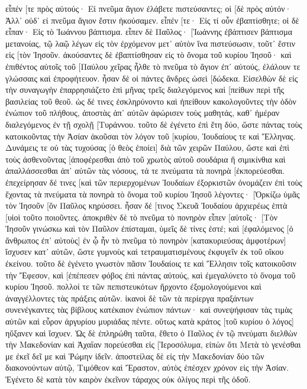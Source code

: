 εἶπέν [τε πρὸς αὐτούς· Εἰ πνεῦμα ἅγιον ἐλάβετε πιστεύσαντες; οἱ [δὲ πρὸς αὐτόν· Ἀλλ᾽ οὐδ᾽ εἰ πνεῦμα ἅγιον ἔστιν ἠκούσαμεν. 
εἶπέν [τε· Εἰς τί οὖν ἐβαπτίσθητε; οἱ δὲ εἶπαν· Εἰς τὸ Ἰωάννου βάπτισμα. 
εἶπεν δὲ Παῦλος· [Ἰωάννης ἐβάπτισεν βάπτισμα μετανοίας, τῷ λαῷ λέγων εἰς τὸν ἐρχόμενον μετ᾽ αὐτὸν ἵνα πιστεύσωσιν, τοῦτ᾽ ἔστιν εἰς [τὸν Ἰησοῦν. 
ἀκούσαντες δὲ ἐβαπτίσθησαν εἰς τὸ ὄνομα τοῦ κυρίου Ἰησοῦ· 
καὶ ἐπιθέντος αὐτοῖς τοῦ [Παύλου χεῖρας ἦλθε τὸ πνεῦμα τὸ ἅγιον ἐπ᾽ αὐτούς, ἐλάλουν τε γλώσσαις καὶ ἐπροφήτευον. 
ἦσαν δὲ οἱ πάντες ἄνδρες ὡσεὶ [δώδεκα. 
Εἰσελθὼν δὲ εἰς τὴν συναγωγὴν ἐπαρρησιάζετο ἐπὶ μῆνας τρεῖς διαλεγόμενος καὶ [πείθων περὶ τῆς βασιλείας τοῦ θεοῦ. 
ὡς δέ τινες ἐσκληρύνοντο καὶ ἠπείθουν κακολογοῦντες τὴν ὁδὸν ἐνώπιον τοῦ πλήθους, ἀποστὰς ἀπ᾽ αὐτῶν ἀφώρισεν τοὺς μαθητάς, καθ᾽ ἡμέραν διαλεγόμενος ἐν τῇ σχολῇ [Τυράννου. 
τοῦτο δὲ ἐγένετο ἐπὶ ἔτη δύο, ὥστε πάντας τοὺς κατοικοῦντας τὴν Ἀσίαν ἀκοῦσαι τὸν λόγον τοῦ [κυρίου, Ἰουδαίους τε καὶ Ἕλληνας. 
Δυνάμεις τε οὐ τὰς τυχούσας [ὁ θεὸς ἐποίει] διὰ τῶν χειρῶν Παύλου, 
ὥστε καὶ ἐπὶ τοὺς ἀσθενοῦντας [ἀποφέρεσθαι ἀπὸ τοῦ χρωτὸς αὐτοῦ σουδάρια ἢ σιμικίνθια καὶ ἀπαλλάσσεσθαι ἀπ᾽ αὐτῶν τὰς νόσους, τά τε πνεύματα τὰ πονηρὰ [ἐκπορεύεσθαι. 
ἐπεχείρησαν δέ τινες [καὶ τῶν περιερχομένων Ἰουδαίων ἐξορκιστῶν ὀνομάζειν ἐπὶ τοὺς ἔχοντας τὰ πνεύματα τὰ πονηρὰ τὸ ὄνομα τοῦ κυρίου Ἰησοῦ λέγοντες· [Ὁρκίζω ὑμᾶς τὸν Ἰησοῦν [ὃν Παῦλος κηρύσσει. 
ἦσαν δέ [τινος Σκευᾶ Ἰουδαίου ἀρχιερέως ἑπτὰ [υἱοὶ τοῦτο ποιοῦντες. 
ἀποκριθὲν δὲ τὸ πνεῦμα τὸ πονηρὸν εἶπεν [αὐτοῖς· [Τὸν Ἰησοῦν γινώσκω καὶ τὸν Παῦλον ἐπίσταμαι, ὑμεῖς δὲ τίνες ἐστέ; 
καὶ [ἐφαλόμενος [ὁ ἄνθρωπος ἐπ᾽ αὐτοὺς] ἐν ᾧ ἦν τὸ πνεῦμα τὸ πονηρὸν [κατακυριεύσας ἀμφοτέρων] ἴσχυσεν κατ᾽ αὐτῶν, ὥστε γυμνοὺς καὶ τετραυματισμένους ἐκφυγεῖν ἐκ τοῦ οἴκου ἐκείνου. 
τοῦτο δὲ ἐγένετο γνωστὸν πᾶσιν Ἰουδαίοις τε καὶ Ἕλλησιν τοῖς κατοικοῦσιν τὴν Ἔφεσον, καὶ [ἐπέπεσεν φόβος ἐπὶ πάντας αὐτούς, καὶ ἐμεγαλύνετο τὸ ὄνομα τοῦ κυρίου Ἰησοῦ. 
πολλοί τε τῶν πεπιστευκότων ἤρχοντο ἐξομολογούμενοι καὶ ἀναγγέλλοντες τὰς πράξεις αὐτῶν. 
ἱκανοὶ δὲ τῶν τὰ περίεργα πραξάντων συνενέγκαντες τὰς βίβλους κατέκαιον ἐνώπιον πάντων· καὶ συνεψήφισαν τὰς τιμὰς αὐτῶν καὶ εὗρον ἀργυρίου μυριάδας πέντε. 
οὕτως κατὰ κράτος [τοῦ κυρίου ὁ λόγος] ηὔξανεν καὶ ἴσχυεν. 
Ὡς δὲ ἐπληρώθη ταῦτα, ἔθετο ὁ Παῦλος ἐν τῷ πνεύματι διελθὼν τὴν Μακεδονίαν καὶ Ἀχαΐαν πορεύεσθαι εἰς [Ἱεροσόλυμα, εἰπὼν ὅτι Μετὰ τὸ γενέσθαι με ἐκεῖ δεῖ με καὶ Ῥώμην ἰδεῖν. 
ἀποστείλας δὲ εἰς τὴν Μακεδονίαν δύο τῶν διακονούντων αὐτῷ, Τιμόθεον καὶ Ἔραστον, αὐτὸς ἐπέσχεν χρόνον εἰς τὴν Ἀσίαν. 
Ἐγένετο δὲ κατὰ τὸν καιρὸν ἐκεῖνον τάραχος οὐκ ὀλίγος περὶ τῆς ὁδοῦ. 

